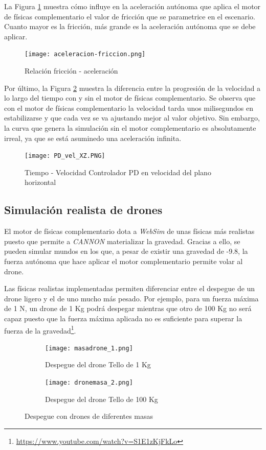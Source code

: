 La Figura \ref{fig:friccion-acele} muestra cómo influye en la aceleración autónoma que aplica el motor de físicas complementario el valor de fricción que se parametrice en el escenario. Cuanto mayor es la fricción, más grande es la aceleración autónoma que se debe aplicar.

\begin{figure}[h!]
    \centering
    \texttt{[image: aceleracion-friccion.png]}
    \caption{Relación fricción - aceleración}
    \label{fig:friccion-acele}
\end{figure}

Por último, la Figura \ref{fig:vel-planoXZ} muestra la diferencia entre la progresión de la velocidad a lo largo del tiempo con y sin el motor de físicas complementario. Se observa que con el motor de físicas complementario la velocidad tarda unos milisegundos en estabilizarse y que cada vez se va ajustando mejor al valor objetivo. Sin embargo, la curva que genera la simulación sin el motor complementario es absolutamente irreal, ya que se está asuminedo una aceleración infinita.

\begin{figure}[h!]
    \centering
    \texttt{[image: PD\_vel\_XZ.PNG]}
    \caption{Tiempo - Velocidad Controlador PD en velocidad del plano horizontal}
    \label{fig:vel-planoXZ}
\end{figure}

\newpage
\subsection{Simulación realista de drones}
El motor de físicas complementario dota a \textit{WebSim} de unas físicas más realistas puesto que permite a \textit{CANNON} materializar la gravedad. Gracias a ello, se pueden simular mundos en los que, a pesar de existir una gravedad de -9.8, la fuerza autónoma que hace aplicar el motor complementario permite volar al drone. \newline

Las físicas realistas implementadas permiten diferenciar entre el despegue de un drone ligero y el de uno mucho más pesado. Por ejemplo, para un fuerza máxima de 1 N, un drone de 1 Kg podrá despegar mientras que otro de 100 Kg no será capaz puesto que la fuerza máxima aplicada no es suficiente para superar la fuerza de la gravedad\footnote{\url{https://www.youtube.com/watch?v=S1E1zKjFkLo}}.

\begin{figure}[h!]
  \centering
  \begin{subfigure}[b]{\textwidth}
    \texttt{[image: masadrone\_1.png]}
    \caption{Despegue del drone Tello de 1 Kg}
  \end{subfigure}
  \hfill
  \begin{subfigure}[b]{\textwidth}
    \texttt{[image: dronemasa\_2.png]}
    \caption{Despegue del drone Tello de 100 Kg}
  \end{subfigure}
\caption{Despegue con drones de diferentes masas}
\label{fig:masadrone}
\end{figure}


